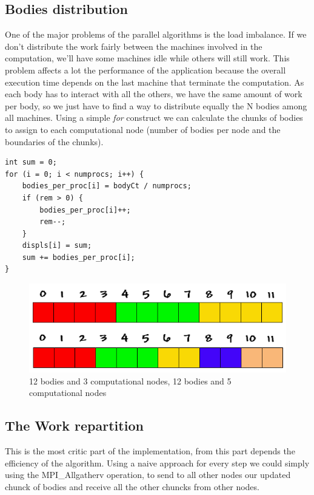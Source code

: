 \documentclass[a4paper]{article}
\begin{document}
\subsection{Bodies distribution}
\label{sec:bodies_distr}
One of the major problems of the parallel algorithms is the load imbalance. If we don't distribute the work fairly between the machines involved in the computation, we'll have some machines idle while others will still work. This problem affects a lot the performance of the application because the overall execution time depends on the last machine that terminate the computation. As each body has to interact with all the others, we have the same amount of work per body, so we just have to find a way to distribute equally the N bodies among all machines. Using a simple \textit{for} construct we can calculate the chunks of bodies to assign to each computational node (number of bodies per node and the boundaries of the chunks).

\begin{lstlisting}
int sum = 0;
for (i = 0; i < numprocs; i++) {
    bodies_per_proc[i] = bodyCt / numprocs;
    if (rem > 0) {
        bodies_per_proc[i]++;
        rem--;
    }
    displs[i] = sum;
    sum += bodies_per_proc[i];
}
\end{lstlisting}

\begin{figure}[ht]
  \centering\includegraphics[width=0.6\linewidth]{array_procs_both}
  \caption{12 bodies and 3 computational nodes, 12 bodies and 5 computational nodes}
  \label{fig:3nodes}
\end{figure}
\FloatBarrier

\subsection{The Work repartition}
\label{sec:work_rep}

This is the most critic part of the implementation, from this part depends the efficiency of the algorithm. 
Using a naive approach for every step we could simply using the MPI_Allgatherv operation, to send to all other nodes our updated chunck of bodies and receive all the other chuncks from other nodes.
\end{document}
